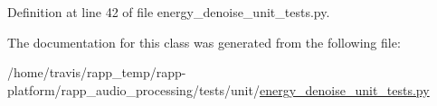 Definition at line 42 of file energy\-\_\-denoise\-\_\-unit\-\_\-tests.\-py.



The documentation for this class was generated from the following file\-:\begin{DoxyCompactItemize}
\item 
/home/travis/rapp\-\_\-temp/rapp-\/platform/rapp\-\_\-audio\-\_\-processing/tests/unit/\hyperlink{energy__denoise__unit__tests_8py}{energy\-\_\-denoise\-\_\-unit\-\_\-tests.\-py}\end{DoxyCompactItemize}
